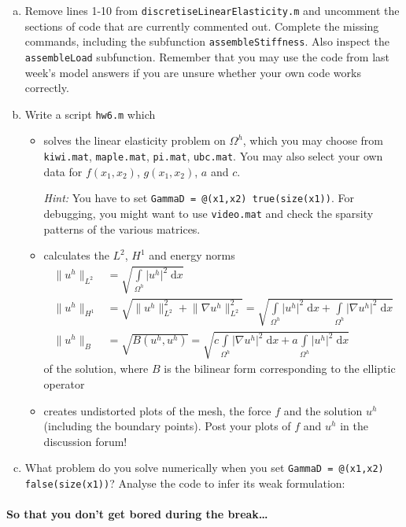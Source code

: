 \documentclass[10pt,letterpaper]{scrartcl}
\newcommand{\dx}{\;\mathrm{d}x}
\begin{document}
\begin{enumerate}[(a)]
\item Remove lines 1-10 from \texttt{discretiseLinearElasticity.m} and uncomment the sections of code that are currently commented out. Complete the missing commands, including the subfunction \texttt{assembleStiffness}. Also inspect the \texttt{assembleLoad} subfunction. Remember that you may use the code from last week's model answers if you are unsure whether your own code works correctly.
\item Write a script \texttt{hw6.m} which
\begin{itemize}
\item solves the linear elasticity problem on $\Omega^h$, which you may choose from \texttt{kiwi.mat}, \texttt{maple.mat}, \texttt{pi.mat}, \texttt{ubc.mat}. You may also select your own data for $f(x_1,x_2)$, $g(x_1,x_2)$, $a$ and $c$.

\emph{Hint:} You have to set \texttt{GammaD = @(x1,x2) true(size(x1))}. For debugging, you might want to use \texttt{video.mat} and check the sparsity patterns of the various matrices.
\item calculates the $L^2$, $H^1$ and energy norms
\begin{align*}
\lVert u^h \rVert_{L^2} &= \sqrt{\int\limits_{\Omega^h} \lvert u^h \rvert^2 \dx}\\
\lVert u^h \rVert_{H^1} &= \sqrt{\lVert u^h \rVert_{L^2}^2 + \lVert \nabla u^h \rVert_{L^2}^2} = \sqrt{\int\limits_{\Omega^h} \lvert u^h \rvert^2 \dx + \int\limits_{\Omega^h} \lvert \nabla u^h \rvert^2 \dx}\\
\lVert u^h \rVert_{B} &= \sqrt{B(u^h,u^h)} = \sqrt{c\int\limits_{\Omega^h} \lvert \nabla u^h \rvert^2 \dx + a \int\limits_{\Omega^h} \lvert u^h \rvert^2 \dx}
\end{align*}
of the solution, where $B$ is the bilinear form corresponding to the elliptic operator
\item creates undistorted plots of the mesh, the force $f$ and the solution $u^h$ (including the boundary points). Post your plots of $f$ and $u^h$ in the discussion forum!
\end{itemize}
\item What problem do you solve numerically when you set \texttt{GammaD = @(x1,x2) false(size(x1))}? Analyse the code to infer its weak formulation:
\end{enumerate}

\vfill

\paragraph*{So that you don't get bored during the break\dots}
\end{document}
